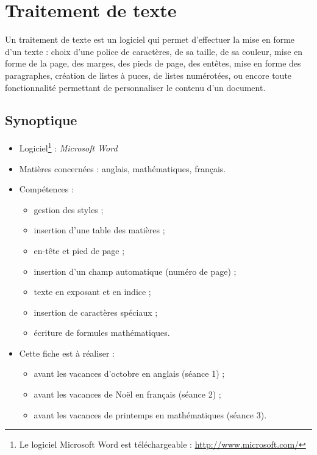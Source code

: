 \chapter{Traitement de texte}  

Un traitement de texte est un logiciel qui permet d'effectuer la mise en forme d'un texte : choix d'une police de caractères, de sa taille, de sa couleur, mise en forme de la page, des marges, des pieds de page, des entêtes, mise en forme des paragraphes, création de listes à puces, de listes numérotées, ou encore toute fonctionnalité permettant de personnaliser le contenu d'un document.

\section*{Synoptique}

{\footnotesize
\begin{itemize}
\item Logiciel\footnote{Le logiciel Microsoft Word est téléchargeable : \url{http://www.microsoft.com/}} : \emph{Microsoft Word} 
\item Matières concernées : anglais, mathématiques, français.
\item Compétences : 
        \begin{itemize}
        \item gestion des styles ;
	\item insertion d'une table des matières ;
	\item en-tête et pied de page ;
	\item insertion d'un champ automatique (numéro de page) ;
	\item texte en exposant et en indice ;
	\item insertion de caractères spéciaux ; 
	\item écriture de formules mathématiques.
        \end{itemize}
\item Cette fiche est à réaliser :
        \begin{itemize}
        \item avant les vacances d'octobre en anglais (séance 1) ;
	\item avant les vacances de Noël en français (séance 2) ;
        \item avant les vacances de printemps en mathématiques (séance 3).     
        \end{itemize}
\end{itemize}
}
\vspace{12pt}




